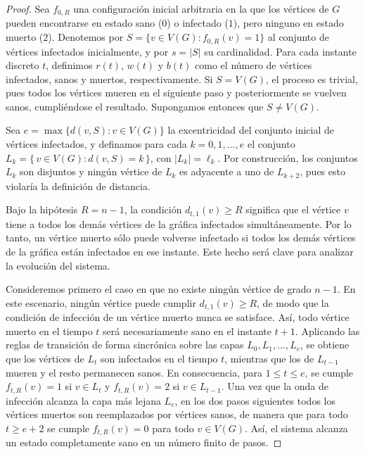 \documentclass[12pt,titlepage,twoside,openright]{book}
\begin{document}
\begin{proof}
    Sea $f_{0,R}$ una configuraci\'on inicial arbitraria en la que los v\'ertices de $G$ pueden encontrarse en estado sano ($0$) o infectado ($1$), pero ninguno en estado muerto ($2$). Denotemos por $S = \{v \in V(G) : f_{0,R}(v) = 1\}$ al conjunto de v\'ertices infectados inicialmente, y por $s = |S|$ su cardinalidad. Para cada instante discreto $t$, definimos $r(t)$, $w(t)$ y $b(t)$ como el n\'umero de v\'ertices infectados, sanos y muertos, respectivamente. Si $S = V(G)$, el proceso es trivial, pues todos los v\'ertices mueren en el siguiente paso y posteriormente se vuelven sanos, cumpli\'endose el resultado. Supongamos entonces que $S \neq V(G)$.

    Sea $e = \max\{d(v,S) : v \in V(G)\}$ la excentricidad del conjunto inicial de v\'ertices infectados, y definamos para cada $k = 0, 1, \ldots, e$ el conjunto $L_k = \{\, v \in V(G) : d(v,S) = k \,\}$, con $|L_k| = \ell_k$. Por construcci\'on, los conjuntos $L_k$ son disjuntos y ning\'un v\'ertice de $L_k$ es adyacente a uno de $L_{k+2}$, pues esto violar\'ia la definici\'on de distancia.

    Bajo la hip\'otesis $R = n-1$, la condici\'on $d_{t,1}(v) \geq R$ significa que el v\'ertice $v$ tiene a todos los dem\'as v\'ertices de la gr\'afica infectados simult\'aneamente. Por lo tanto, un v\'ertice muerto s\'olo puede volverse infectado si todos los dem\'as v\'ertices de la gr\'afica est\'an infectados en ese instante. Este hecho ser\'a clave para analizar la evoluci\'on del sistema.

    Consideremos primero el caso en que no existe ning\'un v\'ertice de grado $n-1$. En este escenario, ning\'un v\'ertice puede cumplir $d_{t,1}(v) \geq R$, de modo que la condici\'on de infecci\'on de un v\'ertice muerto nunca se satisface. As\'i, todo v\'ertice muerto en el tiempo $t$ ser\'a necesariamente sano en el instante $t+1$. Aplicando las reglas de transici\'on de forma sincr\'onica sobre las capas $L_0, L_1, \ldots, L_e$, se obtiene que los v\'ertices de $L_t$ son infectados en el tiempo $t$, mientras que los de $L_{t-1}$ mueren y el resto permanecen sanos. En consecuencia, para $1 \le t \le e$, se cumple $f_{t,R}(v) = 1$ si $v \in L_t$ y $f_{t,R}(v)=2$ si $v \in L_{t-1}$. Una vez que la onda de infecci\'on alcanza la capa m\'as lejana $L_e$, en los dos pasos siguientes todos los v\'ertices muertos son reemplazados por v\'ertices sanos, de manera que para todo $t \ge e+2$ se cumple $f_{t,R}(v)=0$ para todo $v \in V(G)$. As\'i, el sistema alcanza un estado completamente sano en un n\'umero finito de pasos.


\end{proof}
\end{document}
